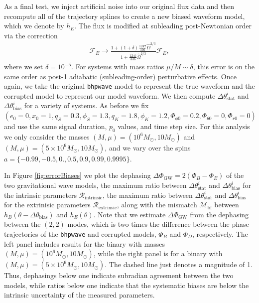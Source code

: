 \documentclass[%
 reprint,
 nofootinbib,
 amsmath,amssymb,
 aps,
 prd,
]{revtex4-2}
\begin{document}
As a final test, we inject artificial noise into our original flux data and then recompute all of the trajectory splines to create a new biased waveform model, which we denote by $h_E$. The flux is modified at subleading post-Newtonian order via the correction
\begin{align}
    \mathcal{F}_E \rightarrow \frac{1 + (1 + \delta)\frac{1247}{336}\hat{\Omega}^{2/3}}{1 + \frac{1247}{336}\hat{\Omega}^{2/3}} \mathcal{F}_E,
\end{align}
where we set $\delta = 10^{-5}$. For systems with mass ratios $\mu/M \sim \delta$, this error is on the same order as post-1 adiabatic (subleading-order) perturbative effects. Once again, we take the original \texttt{bhpwave} model to represent the true waveform and the corrupted model to represent our model waveform. We then compute $\Delta \theta^i_\mathrm{stat}$ and $\Delta \theta^i_\mathrm{bias}$ for a variety of systems. As before we fix $(e_0 = 0, x_0 = 1, q_S = 0.3, \phi_S = 1.3, q_K = 1.8, \phi_K = 1.2, \Phi_{\phi 0} = 0.2, \Phi_{\theta0} = 0, \Phi_{r0} = 0)$ and use the same signal duration, $p_0$ values, and time step size. For this analysis we only consider the masses $(M, \mu) = (10^6 M_\odot, 10 M_\odot)$ and $(M, \mu) = (5\times 10^6 M_\odot, 10 M_\odot)$, and we vary over the spins $a = \{-0.99, -0.5, 0., 0.5, 0.9, 0.99, 0.9995\}$.

In Figure \ref{fig:errorBiases} we plot the dephasing $\Delta \Phi_\mathrm{GW} = 2(\Phi_B - \Phi_E)$ of the two gravitational wave models, the maximum ratio between $\Delta \theta^i_\mathrm{stat}$ and $\Delta \theta^i_\mathrm{bias}$ for the intrinsic parameters $\mathcal{R}_\mathrm{intrinsic}$, the maximum ratio between $\Delta \theta^i_\mathrm{stat}$ and $\Delta \theta^i_\mathrm{bias}$ for the extrinisic parameters $\mathcal{R}_\mathrm{extrinsic}$, along with the mismatch $\mathcal{M}_\mathrm{bf}$ between $h_B(\theta-\Delta \theta_\mathrm{bias})$ and $h_E(\theta)$. Note that we estimate $\Delta \Phi_\mathrm{GW}$ from the dephasing between the $(2,2)$-modes, which is two times the difference between the phase trajectories of the \texttt{bhpwave} and corrupted models, $\Phi_B$ and $ \Phi_D$, respectively. The left panel includes results for the binary with masses $(M, \mu) = (10^6 M_\odot, 10 M_\odot)$, while the right panel is for a binary with $(M, \mu) = (5\times 10^6 M_\odot, 10 M_\odot)$. The dashed line just denotes a magnitude of 1. Thus, dephasings below one indicate subradian agreement between the two models, while ratios below one indicate that the systematic biases are below the intrinsic uncertainty of the measured parameters.
\end{document}
